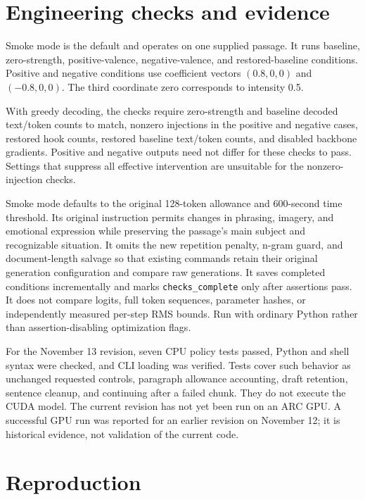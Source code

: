 \documentclass[manuscript,screen,nonacm]{acmart}
\begin{document}
\section{Engineering checks and
evidence}\label{engineering-checks-and-evidence}

Smoke mode is the default and operates on one supplied passage. It runs
baseline, zero-strength, positive-valence, negative-valence, and
restored-baseline conditions. Positive and negative conditions use
coefficient vectors \((0.8,0,0)\) and \((-0.8,0,0)\). The third
coordinate zero corresponds to intensity 0.5.

With greedy decoding, the checks require zero-strength and baseline
decoded text/token counts to match, nonzero injections in the positive
and negative cases, restored hook counts, restored baseline text/token
counts, and disabled backbone gradients. Positive and negative outputs
need not differ for these checks to pass. Settings that suppress all
effective intervention are unsuitable for the nonzero-injection checks.

Smoke mode defaults to the original 128-token allowance and 600-second
time threshold. Its original instruction permits changes in phrasing,
imagery, and emotional expression while preserving the passage's main
subject and recognizable situation. It omits the new repetition penalty,
n-gram guard, and document-length salvage so that existing commands
retain their original generation configuration and compare raw
generations. It saves completed conditions incrementally and marks
\nolinkurl{checks_complete} only after assertions pass. It does not
compare logits, full token sequences, parameter hashes, or independently
measured per-step RMS bounds. Run with ordinary Python rather than
assertion-disabling optimization flags.

For the November 13 revision, seven CPU policy tests passed, Python and
shell syntax were checked, and CLI loading was verified. Tests cover
such behavior as unchanged requested controls, paragraph allowance
accounting, draft retention, sentence cleanup, and continuing after a
failed chunk. They do not execute the CUDA model. The current revision
has not yet been run on an ARC GPU. A successful GPU run was reported
for an earlier revision on November 12; it is historical evidence, not
validation of the current code.

\section{Reproduction}\label{reproduction}
\end{document}
